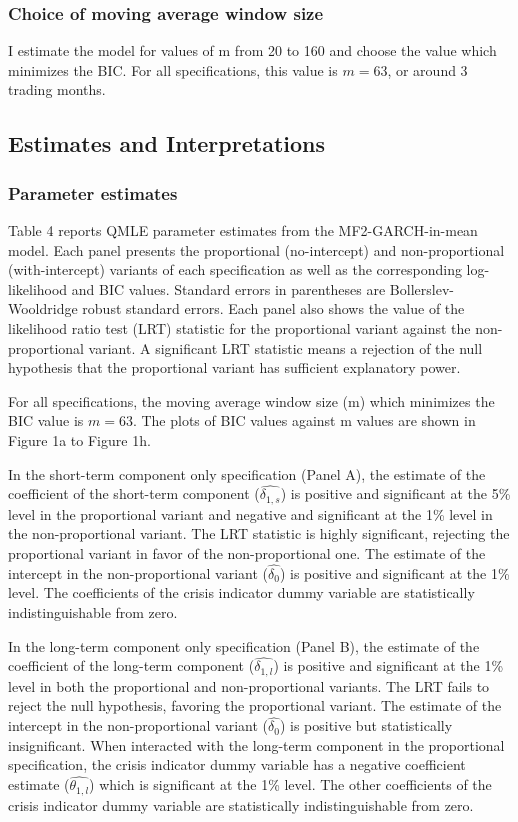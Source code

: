 \documentclass[12pt]{article}
\begin{document}
\subsubsection{Choice of moving average window size}
I estimate the model for values of m from 20 to 160 and choose the value which minimizes the BIC. For all specifications, this value is $m=63$, or around 3 trading months.
\subsection{Estimates and Interpretations}
\subsubsection{Parameter estimates}
Table 4 reports QMLE parameter estimates from the MF2-GARCH-in-mean model. Each panel presents the proportional (no-intercept) and non-proportional (with-intercept) variants of each specification as well as the corresponding log-likelihood and BIC values. Standard errors in parentheses are Bollerslev-Wooldridge robust standard errors. Each panel also shows the value of the likelihood ratio test (LRT) statistic for the proportional variant against the non-proportional variant. A significant LRT statistic means a rejection of the null hypothesis that the proportional variant has sufficient explanatory power.\par
For all specifications, the moving average window size (m) which minimizes the BIC value is $m=63$. The plots of BIC values against m values are shown in Figure 1a to Figure 1h.\par
In the short-term component only specification (Panel A), the estimate of the coefficient of the short-term component ($\widehat{\delta_{1,s}}$) is positive and significant at the 5\% level in the proportional variant and negative and significant at the 1\% level in the non-proportional variant. The LRT statistic is highly significant, rejecting the proportional variant in favor of the non-proportional one. The estimate of the intercept in the non-proportional variant ($\widehat{\delta_0}$) is positive and significant at the 1\% level. The coefficients of the crisis indicator dummy variable are statistically indistinguishable from zero.\par
In the long-term component only specification (Panel B), the estimate of the coefficient of the long-term component ($\widehat{\delta_{1,l}}$) is positive and significant at the 1\% level in both the proportional and non-proportional variants. The LRT fails to reject the null hypothesis, favoring the proportional variant. The estimate of the intercept in the non-proportional variant ($\widehat{\delta_0}$) is positive but statistically insignificant.  When interacted with the long-term component in the proportional specification, the crisis indicator dummy variable has a negative coefficient estimate ($\widehat{\theta_{1,l}}$) which is significant at the 1\% level. The other coefficients of the crisis indicator dummy variable are statistically indistinguishable from zero.\par
\end{document}
